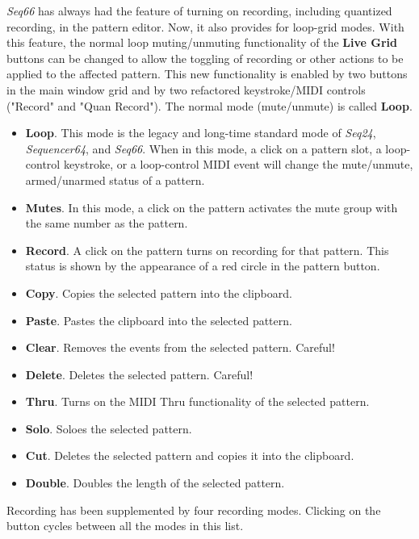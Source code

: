    \textsl{Seq66} has always had the feature of turning on recording,
   including quantized recording, in the pattern editor.
   Now, it also provides for
   loop-grid modes.
   With this feature, the normal loop muting/unmuting
   functionality of the \textbf{Live Grid} buttons
   can be changed to allow the toggling
   of recording or other actions to be applied to the affected  pattern.
   This new functionality is enabled by two buttons in the main window grid and
   by two refactored keystroke/MIDI controls ("Record" and "Quan Record").
   The normal mode (mute/unmute) is called \textbf{Loop}.

   \begin{itemize}
      \item \textbf{Loop}.
         This mode is the legacy and long-time standard mode of
         \textsl{Seq24}, \textsl{Sequencer64}, and \textsl{Seq66}.
         When in this mode, a click on a pattern slot, a loop-control
         keystroke, or a loop-control MIDI event will change the mute/unmute,
         armed/unarmed status of a pattern.
      \item \textbf{Mutes}.
         In this mode, a click on the pattern activates the
         mute group with the same number as the pattern.
      \item \textbf{Record}.
         A click on the pattern turns on recording for that pattern.
         This status is shown by the appearance of a red circle in the pattern
         button.
      \item \textbf{Copy}.
         Copies the selected pattern into the clipboard.
      \item \textbf{Paste}.
         Pastes the clipboard into the selected pattern.
      \item \textbf{Clear}.
         Removes the events from the selected pattern.  Careful!
      \item \textbf{Delete}.
         Deletes the selected pattern.  Careful!
      \item \textbf{Thru}.
         Turns on the MIDI Thru functionality of the selected pattern.
      \item \textbf{Solo}.
         Soloes the selected pattern.
      \item \textbf{Cut}.
         Deletes the selected pattern and copies it into the clipboard.
      \item \textbf{Double}.
         Doubles the length of the selected pattern.
   \end{itemize}
   Recording has been supplemented by four recording modes.
   Clicking on the button cycles between all the modes in this list.

